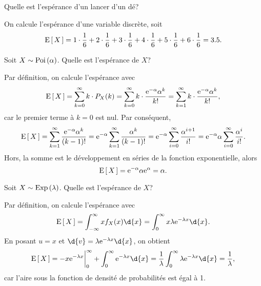 \documentclass[11pt]{article}
\newcommand\e{%
	\ensuremath{%
		\mathrm{e}%
	}%
}%
\newcommand\Poi[1]{%
	\ensuremath{%
		\mathrm{Poi}\left(#1\right)%
	}%
}%
\newcommand\Exp[1]{%
	\ensuremath{%
		\mathrm{Exp}\left(#1\right)%
	}%
}%
\newcommand\Esp[1]{%
	\ensuremath{%
		\mathrm{E}\left[\,#1\,\right]%
	}%
}%
\begin{document}
\begin{exemple}
	Quelle est l'espérance d'un lancer d'un dé?

	On calcule l'espérance d'une variable discrète, soit
	\begin{equation*}
		\Esp{X}=
			1\cdot\frac{1}{6}+
			2\cdot\frac{1}{6}+
			3\cdot\frac{1}{6}+
			4\cdot\frac{1}{6}+
			5\cdot\frac{1}{6}+
			6\cdot\frac{1}{6}
		=3.5.
	\end{equation*}
\end{exemple}

\begin{exemple}
	Soit $X\sim\Poi{\alpha}$. Quelle est l'espérance de $X$?

	Par définition, on calcule l'espérance avec
	\begin{equation*}
		\Esp{X}
		=\sum_{k=0}^\infty k\cdot P_X(k)
		=\sum_{k=0}^\infty k\cdot\frac{\e^{-\alpha}\alpha^k}{k!}
		=\sum_{k=1}^\infty k\cdot\frac{\e^{-\alpha}\alpha^k}{k!},
	\end{equation*}
	car le premier terme à $k=0$ est nul. Par conséquent,
	\begin{equation*}
		\Esp{X}
		=\sum_{k=1}^\infty\frac{\e^{-\alpha}\alpha^k}{(k-1)!}
		=\e^{-\alpha}\sum_{k=1}^\infty\frac{\alpha^k}{(k-1)!}
		=\e^{-\alpha}\sum_{i=0}^\infty\frac{\alpha^{i+1}}{i!}
		=\e^{-\alpha}\alpha\sum_{i=0}^\infty\frac{\alpha^i}{i!}.
	\end{equation*}
	Hors, la somme est le développement en séries de la fonction exponentielle,
	alors
	\begin{equation*}
		\Esp{X}
		=\e^{-\alpha}\alpha\e^{\alpha}
		=\alpha.
	\end{equation*}
\end{exemple}

\pagebreak
\begin{exemple}
	Soit $X\sim\Exp{\lambda}$. Quelle est l'espérance de $X$?

	Par définition, on calcule l'espérance avec
	\begin{equation*}
		\Esp{X}
		=\int_{-\infty}^\infty xf_X(x)\d{x}
		=\int_0^\infty x\lambda\e^{-\lambda x}\d{x}.
	\end{equation*}
	En posant $u=x$ et $\d{v}=\lambda\e^{-\lambda x}\d{x}$, on obtient
	\begin{equation*}
		\Esp{X}
		=-x\e^{-\lambda x}\bigg\rvert_0^\infty
		+\int_0^\infty\e^{-\lambda x}\d{x}
		=\frac{1}{\lambda}\int_0^\infty\lambda\e^{-\lambda x}\d{x}
		=\frac{1}{\lambda},
	\end{equation*}
	car l'aire sous la fonction de densité de probabilités est égal à 1.
\end{exemple}
\end{document}
